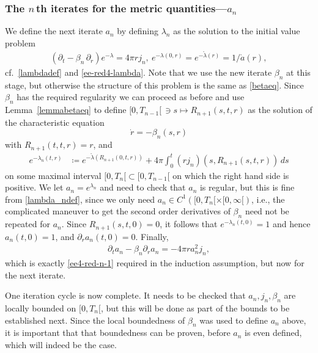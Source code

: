 \documentclass[11pt]{article}
\begin{document}
\subsubsection{The $n\,$th iterates for the metric quantities---$a_n$}
\label{sectionandef}
%
%
We define the next iterate $a_n$ by defining
$\lambda_n$ as the solution to the initial value
problem
\begin{align}\label{ee-red4-lambdan}
 \left(\partial_t -\beta_{n}\, \partial_r\right) e^{-\lambda} = 4\pi r j_n,\ 
e^{-\lambda(0,r)} = e^{-\mathring{\lambda}(r)}=1/\mathring{a}(r),
\end{align}
cf.\ \eqref{lambdadef} and \eqref{ee-red4-lambda}.
Note that we use the new iterate $\beta_n$ at this stage, but otherwise
the structure of this problem is the same as \eqref{betaeq}.
Since $\beta_n$ has the required regularity we can proceed as before
and use Lemma~\ref{lemmabetaeq} to define
$[0,T_{n-1}[\,\ni s\mapsto R_{n+1}(s,t,r)$
as the solution of the characteristic equation
\[
\dot r = - \beta_{n}(s,r)
\]
with $R_{n+1}(t,t,r)=r$,
and
\begin{align}
  e^{-\lambda_n(t,r)}
  &\coloneqq
  e^{-\mathring{\lambda}(R_{n+1}(0,t,r))}
  + 4\pi \int_0^t(r j_n)(s,R_{n+1}(s,t,r))\, ds
  \label{lambda_ndef}
\end{align}
on some maximal interval $[0,T_{n}[\subset [0,T_{n-1}[$
on which the right hand side is positive.
We let $a_n = e^{\lambda_n}$ and need to check that $a_n$ is 
regular, but this is fine from
\eqref{lambda_ndef}, since we only need
$a_n \in C^1([0,T_{n}[ \times [0,\infty[)$, i.e., the complicated maneuver to
get the second order derivatives of $\beta_n$ need not be repeated
for $a_n$. Since $R_{n+1}(s,t,0)=0$, it follows that $e^{-\lambda_n(t,0)}=1$
and hence $a_n(t,0)=1$, and $\partial_r a_n(t,0)=0$.
Finally,
\begin{align}\label{a_neqn}
\partial_t a_n - \beta_n \partial_r a_n = -4\pi r a_n^2 j_n,
\end{align}
which is exactly \eqref{ee4-red-n-1} required 
in the induction assumption,
but now for the next iterate. 
    
One iteration cycle is now complete. It needs to be checked that
$a_n, j_n, \beta_n$ are locally bounded on $[0,T_n[$, but this will be done
as part of the bounds to be established next. Since the local boundedness
of $\beta_n$ was used to define $a_n$ above,
it is important that that boundedness
can be proven, before $a_n$ is even defined, which will indeed be the case.
%
%
\end{document}
